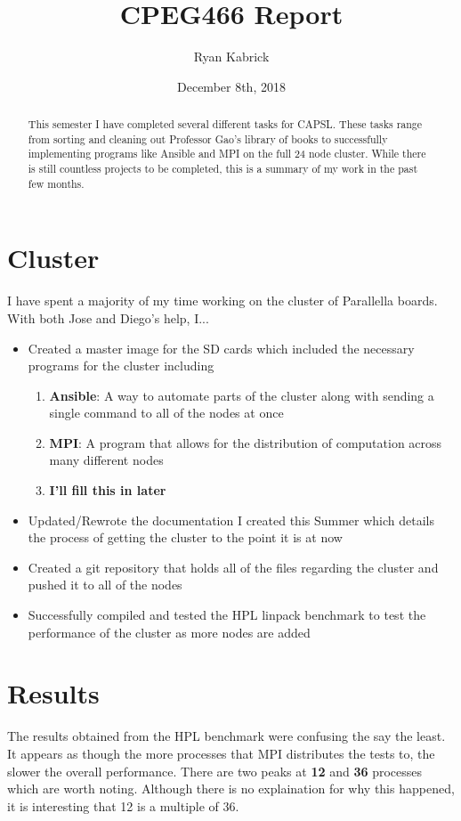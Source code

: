 \documentclass[letterpaper,12pt]{article}
\begin{document}
\title{CPEG466 Report}
\author{Ryan Kabrick}
\date{December 8th, 2018}
\maketitle

\begin{abstract}
This semester I have completed several different tasks for CAPSL. These tasks range from sorting and cleaning out Professor Gao's library of books to successfully implementing programs like Ansible and MPI on the full 24 node cluster. While there is still countless projects to be completed, this is a summary of my work in the past few months.
\end{abstract}


\section{Cluster}
I have spent a majority of my time working on the cluster of Parallella boards. With both Jose and Diego's help, I...
\begin{itemize}
\item Created a master image for the SD cards which included the necessary programs for the cluster including
  \begin{enumerate}
  \item \textbf{Ansible}: A way to automate parts of the cluster along with sending a single command to all of the nodes at once
  \item \textbf{MPI}: A program that allows for the distribution of computation across many different nodes
  \item \textbf{I'll fill this in later}
  \end{enumerate}
\item Updated/Rewrote the documentation I created this Summer which details the process of getting the cluster to the point it is at now
  \item Created a git repository that holds all of the files regarding the cluster and pushed it to all of the nodes
  \item Successfully compiled and tested the HPL linpack benchmark to test the performance of the cluster as more nodes are added
\end{itemize}

\section{Results}
The results obtained from the HPL benchmark were confusing the say the least. It appears as though the more processes that MPI distributes the tests to, the slower the overall performance. There are two peaks at \textbf{12} and \textbf{36} processes which are worth noting. Although there is no explaination for why this happened, it is interesting that 12 is a multiple of 36.
\end{document}
